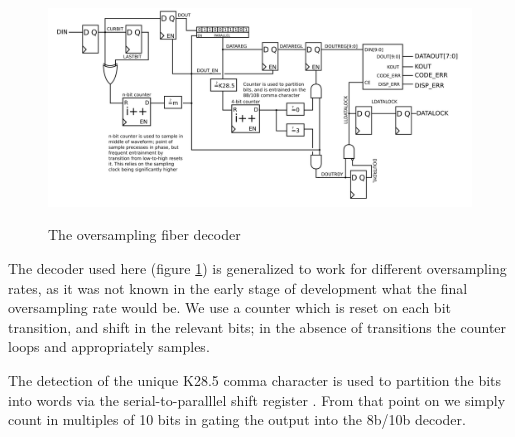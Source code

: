 \begin{figure}[h!]
\includegraphics[scale=1.0]{decoder.svg}
\label{decoder}
\caption{The oversampling fiber decoder}
\end{figure}

The decoder used here (figure \ref{decoder}) is generalized to work
for different oversampling rates, as it was not known in the early
stage of development what the final oversampling rate would be. We use
a counter which is reset on each bit transition, and shift in the
relevant bits; in the absence of transitions the counter loops and
appropriately samples.

The detection of the unique K28.5 comma character is used to partition
the bits into words via the serial-to-paralllel shift register
. From that point on we simply count in multiples of
10 bits in gating the output into the 8b/10b decoder.



